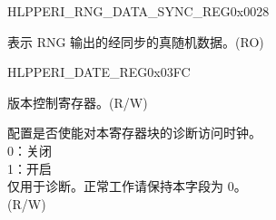 \begin{register}{H}{LPPERI\_RNG\_DATA\_SYNC\_REG}{0x0028}\label{regdesc:LPPERIRNGSYNCDATAREG}
%
\regnewline%
\begin{regdesc}\begin{reglist}
\label{fielddesc:LPPERIRNDSYNCDATA}\item [LPPERI\_RND\_SYNC\_DATA] 表示 RNG 输出的经同步的真随机数据。(RO)
\end{reglist}\end{regdesc}
\end{register}


\begin{register}{H}{LPPERI\_DATE\_REG}{0x03FC}\label{regdesc:LPPERIDATEREG}
%
%
\regnewline%
\begin{regdesc}\begin{reglist}
\label{fielddesc:LPPERILPPERIDATE}\item [LPPERI\_LPPERI\_DATE] 版本控制寄存器。(R/W)
\label{fielddesc:LPPERICLKEN}\item [LPPERI\_CLK\_EN] 配置是否使能对本寄存器块的诊断访问时钟。\\
0：关闭\\
1：开启\\
仅用于诊断。正常工作请保持本字段为 0。\\
(R/W)
\end{reglist}\end{regdesc}
\end{register}

